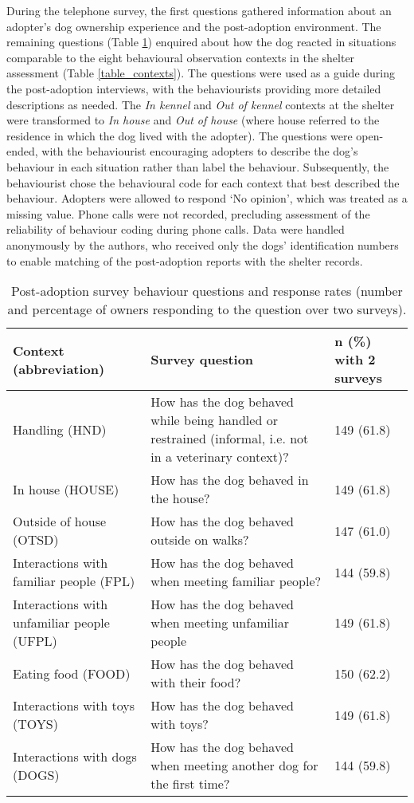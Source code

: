 \documentclass[12pt]{article}
\begin{document}
During the telephone survey, the first questions gathered information about an adopter's dog ownership experience and the post-adoption environment. The remaining questions (Table \ref{table_postadoptq}) enquired about how the dog reacted in situations comparable to the eight behavioural observation contexts in the shelter assessment (Table \ref{table_contexts}). The questions were used as a guide during the post-adoption interviews, with the behaviourists providing more detailed descriptions as needed. The \textit{In kennel} and \textit{Out of kennel} contexts at the shelter were transformed to \textit{In house} and \textit{Out of house} (where house referred to the residence in which the dog lived with the adopter). The questions were open-ended, with the behaviourist encouraging adopters to describe the dog's behaviour in each situation rather than label the behaviour. Subsequently, the behaviourist chose the behavioural code for each context that best described the behaviour. Adopters were allowed to respond `No opinion', which was treated as a missing value. Phone calls were not recorded, precluding assessment of the reliability of behaviour coding during phone calls. Data were handled anonymously by the authors, who received only the dogs' identification numbers to enable matching of the post-adoption reports with the shelter records.

\begin{table}
  \centering
  \begin{tabular}{p{6cm}p{6cm}p{5cm}}
    \textbf{Context (abbreviation)} & \textbf{Survey question} & \textbf{$\boldsymbol{n}$ (\%) with 2 surveys}\\ \hline
    Handling (HND) & \footnotesize{How has the dog behaved while being handled or restrained (informal, i.e. not in a veterinary context)?} & 149 (61.8)\\
    In house (HOUSE) & \footnotesize{How has the dog behaved in the house?} & 149 (61.8)\\
    Outside of house (OTSD) & \footnotesize{How has the dog behaved outside on walks?} & 147 (61.0)\\
    Interactions with familiar people (FPL) & \footnotesize{How has the dog behaved when meeting familiar people?} & 144 (59.8)\\
    Interactions with unfamiliar people (UFPL) & \footnotesize{How has the dog behaved when meeting unfamiliar people} & 149 (61.8)\\
    Eating food (FOOD) & \footnotesize{How has the dog behaved with their food?} & 150 (62.2)\\
    Interactions with toys (TOYS) & \footnotesize{How has the dog behaved with toys?} & 149 (61.8)\\
    Interactions with dogs (DOGS) & \footnotesize{How has the dog behaved when meeting another dog for the first time?} & 144 (59.8)\\
    \hline
  \end{tabular}
  \caption{Post-adoption survey behaviour questions and response rates (number and percentage of owners responding to the question over two surveys).}
  \label{table_postadoptq}
\end{table}
\end{document}

